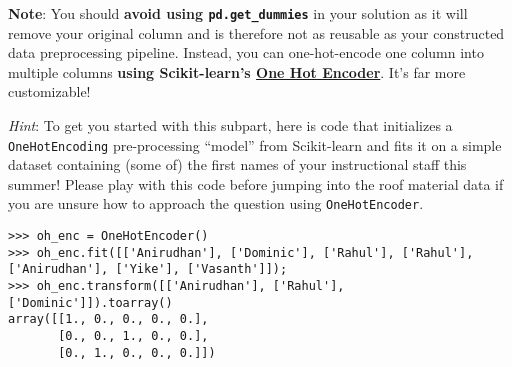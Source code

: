 \documentclass[11pt]{article}
\begin{document}
\textbf{Note}: You should \textbf{avoid using \texttt{pd.get\_dummies}}
in your solution as it will remove your original column and is therefore
not as reusable as your constructed data preprocessing pipeline.
Instead, you can one-hot-encode one column into multiple columns
\textbf{using Scikit-learn's
\href{https://scikit-learn.org/stable/modules/generated/sklearn.preprocessing.OneHotEncoder.html}{One
Hot Encoder}}. It's far more customizable!

\emph{Hint}: To get you started with this subpart, here is code that
initializes a \texttt{OneHotEncoding} pre-processing ``model'' from
Scikit-learn and fits it on a simple dataset containing (some of) the
first names of your instructional staff this summer! Please play with
this code before jumping into the roof material data if you are unsure
how to approach the question using \texttt{OneHotEncoder}.

\begin{verbatim}
>>> oh_enc = OneHotEncoder()
>>> oh_enc.fit([['Anirudhan'], ['Dominic'], ['Rahul'], ['Rahul'], ['Anirudhan'], ['Yike'], ['Vasanth']]);
>>> oh_enc.transform([['Anirudhan'], ['Rahul'], ['Dominic']]).toarray()
array([[1., 0., 0., 0., 0.],
       [0., 0., 1., 0., 0.],
       [0., 1., 0., 0., 0.]])
\end{verbatim}
\end{document}
